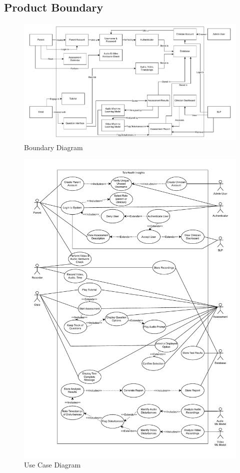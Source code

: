 \documentclass[12pt]{article}
\begin{document}
\subsection{Product Boundary}
\begin{figure}[H]
  \centering
  \includegraphics[scale=0.5]{images/BoundaryDiagram.pdf}
  \caption{Boundary Diagram}
\end{figure}
\begin{figure}[H]
  \centering
  \includegraphics[scale=0.7]{images/UseCaseDiagram.pdf}
  \caption{Use Case Diagram}
\end{figure}
\end{document}
